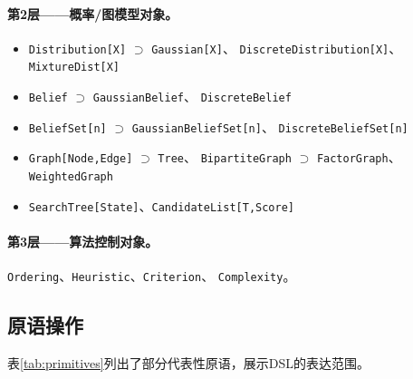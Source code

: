 \documentclass[12pt,a4paper]{article}
\begin{document}
\paragraph{第2层——概率/图模型对象。}
\begin{itemize}[itemsep=0pt]
  \item \texttt{Distribution[X]} $\supset$ \texttt{Gaussian[X]}、
        \texttt{DiscreteDistribution[X]}、\texttt{MixtureDist[X]}
  \item \texttt{Belief} $\supset$ \texttt{GaussianBelief}、
        \texttt{DiscreteBelief}
  \item \texttt{BeliefSet[n]} $\supset$ \texttt{GaussianBeliefSet[n]}、
        \texttt{DiscreteBeliefSet[n]}
  \item \texttt{Graph[Node,Edge]} $\supset$ \texttt{Tree}、
        \texttt{BipartiteGraph} $\supset$ \texttt{FactorGraph}、
        \texttt{WeightedGraph}
  \item \texttt{SearchTree[State]}、\texttt{CandidateList[T,Score]}
\end{itemize}

\paragraph{第3层——算法控制对象。}
\texttt{Ordering}、\texttt{Heuristic}、\texttt{Criterion}、
\texttt{Complexity}。

\subsection{原语操作}

表\ref{tab:primitives}列出了部分代表性原语，展示DSL的表达范围。
\end{document}

